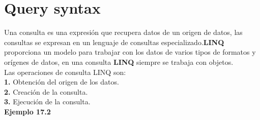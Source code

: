\documentclass[12pt,a4paper]{report}
\begin{document}
\section{Query syntax}
Una consulta es una expresión que recupera datos de un origen de datos, las consultas se expresan en un lenguaje de consultas especializado.\textbf{LINQ} proporciona un modelo para trabajar con los datos de varios tipos de formatos y orígenes de datos, en una consulta\textbf{ LINQ} siempre se trabaja con objetos.\\Las operaciones de consulta LINQ son:\\\textbf{1.} Obtención del origen de los datos.\\\textbf{2.} Creación de la consulta.\\\textbf{3.} Ejecución de la consulta.\\\textbf{Ejemplo 17.2}
\end{document}
